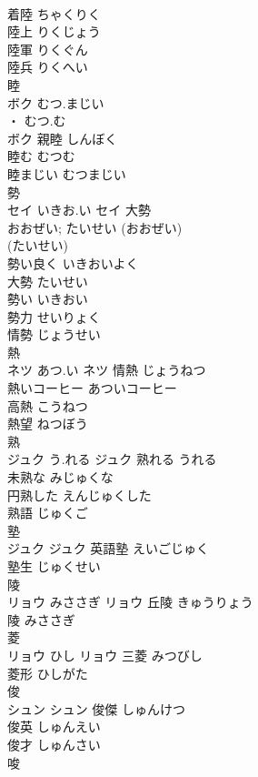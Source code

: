 \documentclass[8pt]{extreport}
\begin{document}
\begin{CJK}{UTF8}{min}
\\	着陸	ちゃくりく	
\\	陸上	りくじょう	
\\	陸軍	りくぐん	
\\	陸兵	りくへい	
\\	睦	
\\	ボク	むつ.まじい
\\	・ むつ.む
\\	ボク	親睦	しんぼく	
\\	睦む	むつむ	
\\	睦まじい	むつまじい	
\\	勢	
\\	セイ	いきお.い	セイ	大勢 
\\	おおぜい; たいせい	(おおぜい) 
\\	(たいせい) 
\\	勢い良く	いきおいよく	
\\	大勢	たいせい	
\\	勢い	いきおい	
\\	勢力	せいりょく	
\\	情勢	じょうせい	
\\	熱	
\\	ネツ	あつ.い	ネツ	情熱	じょうねつ	
\\	熱いコーヒー	あついコーヒー	
\\	高熱	こうねつ	
\\	熱望	ねつぼう	
\\	熟	
\\	ジュク	う.れる	ジュク	熟れる	うれる	
\\	未熟な	みじゅくな	
\\	円熟した	えんじゅくした	
\\	熟語	じゅくご	
\\	塾	
\\	ジュク		ジュク	英語塾	えいごじゅく	
\\	塾生	じゅくせい	
\\	陵	
\\	リョウ	みささぎ	リョウ	丘陵	きゅうりょう	
\\	陵	みささぎ	
\\	菱	
\\	リョウ	ひし	リョウ	三菱	みつびし	
\\	菱形	ひしがた	
\\	俊	
\\	シュン		シュン	俊傑	しゅんけつ	
\\	俊英	しゅんえい	
\\	俊才	しゅんさい	
\\	唆	

\end{CJK}
\end{document}
